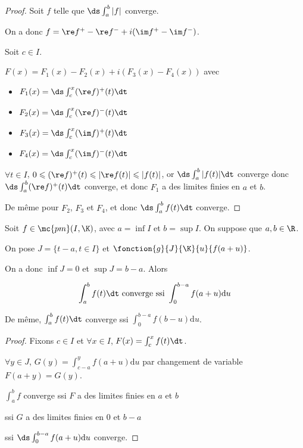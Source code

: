 \begin{proof}
    Soit $f$ telle que $\ds \int_{a}^b |f|$ converge. 
    
    On a donc 
    $f = \re f^+ - \re f^- + i (\im f^+ - \im f^-)$.

    Soit $c \in I$. 

    $F(x) = F_1(x) - F_2(x) + i (F_3(x) - F_4(x))$ avec
    \begin{itemize}
        \item $F_1(x) = \ds \int_c^x (\re f)^+(t) \dt$
        \item $F_2(x) = \ds \int_c^x (\re f)^-(t) \dt$
        \item $F_3(x) = \ds \int_c^x (\im f)^+(t) \dt$
        \item $F_4(x) = \ds \int_c^x (\im f)^-(t) \dt$
    \end{itemize}

    $\forall t \in I$, $0 \leqslant (\re f)^+(t) \leqslant |\re f(t)| \leqslant |f(t)|$, or 
    $\ds \int_{a }^{b } |f(t)| \dt$ converge donc \\ 
    $\ds \int_{a }^{b } (\re f)^+(t) \dt$ converge, 
    et donc $F_1$ a des limites finies en $a$ et $b$.

    De même pour $F_2$, $F_3$ et $F_4$, et donc $\ds \int_{a }^{b } f(t) \dt$ converge. 
\end{proof}


\begin{proposition}{}{}
    Soit $f \in \mc {pm} (I, \K)$, avec $a = \inf I$ et $b = \sup I$. On suppose que $a, b \in \R$. 

    On pose $J = \{t - a, t \in I\}$ et $\fonction{g}{J}{\K}{u}{f(a + u)}$. 

    On a donc $\inf J = 0$ et $\sup J = b - a$. Alors 
    
    $$ \int_{a }^{b } f(t) \dt \text{ converge ssi } \int_{0 }^{b - a }f(a + u) \mathrm d u$$

    De même, $\int_a^b f(t) \dt$ converge ssi $\int_0^{b - a} f(b - u) \mathrm d u$. 
\end{proposition}


\begin{proof}
    Fixons $c \in I$ et $\forall x \in I$, $F(x) = \int_c^x f(t) \dt$.

    $\forall y \in J$, $G(y) = \int_{c - a}^{y} f(a + u) \mathrm d u$ par changement de variable 
    $F(a + y) = G(y)$.

    $\int_a^b f$ converge ssi $F$ a des limites finies en $a$ et $b$ 

    ssi $G$ a des limites finies en $0$ et $b - a$

    ssi $\ds \int_{0}^{b - a} f(a + u) \mathrm d u$ converge.
\end{proof}



